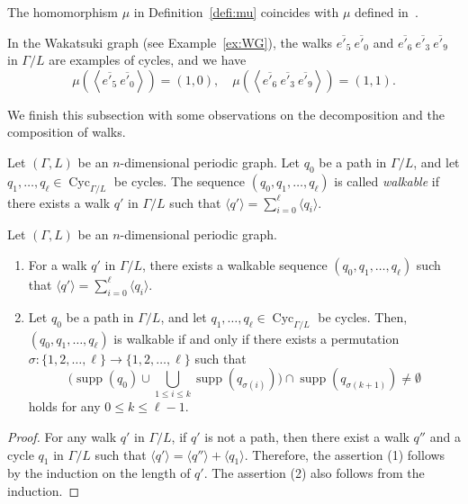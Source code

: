 \documentclass[ALCO,published]{cedram}
\theoremstyle{remark}
\begin{document}
\begin{rmk}\label{rmk:mu}
The homomorphism $\mu$ in Definition~\ref{defi:mu} coincides with $\mu$ defined in~\cite[Section 6.1]{Sunada}. 
\end{rmk}


\begin{ex}
In the Wakatsuki graph (see Example~\ref{ex:WG}), 
the walks $\overline{e'_5} \ \overline{e'_0}$ and $\overline{e'_6} \ \overline{e'_3} \ \overline{e'_9}$ in $\Gamma / L$ are examples of cycles, and we have 
\[
\mu \left( \left \langle \overline{e'_5} \ \overline{e'_0} \right \rangle \right) = (1,0), \quad 
\mu \left( \left \langle \overline{e'_6} \ \overline{e'_3} \ \overline{e'_9} \right \rangle \right) = (1,1). 
\]
\end{ex}

We finish this subsection with some observations on the decomposition and the composition of walks.


\begin{defi}
Let $(\Gamma, L)$ be an $n$-dimensional periodic graph. 
Let $q_0$ be a path in $\Gamma /L$, and let $q_1, \ldots, q_{\ell} \in \operatorname{Cyc}_{\Gamma /L}$ be cycles. 
The sequence $(q_0, q_1, \ldots, q_{\ell})$ is called \textit{walkable} 
if there exists a walk $q'$ in $\Gamma / L$ such that 
$\langle q' \rangle = \sum _{i = 0} ^{\ell} \langle q_i \rangle$. 
\end{defi}

\begin{lem}\label{lem:bunkai}
Let $(\Gamma, L)$ be an $n$-dimensional periodic graph. 
\begin{enumerate}
\item 
For a walk $q'$ in $\Gamma / L$, there exists a walkable sequence $(q_0, q_1, \ldots , q_{\ell})$ such that 
$\langle q' \rangle = \sum _{i = 0} ^{\ell} \langle q_i \rangle$. 

\item 
Let $q_0$ be a path in $\Gamma /L$, and let $q_1, \ldots, q_{\ell} \in \operatorname{Cyc}_{\Gamma /L}$ be cycles. 
Then, $(q_0, q_1, \ldots, q_{\ell})$ is walkable if and only if 
there exists a permutation $\sigma:  \{ 1,2, \ldots, \ell \} \to \{ 1,2, \ldots, \ell \}$ such that
\[
\biggl( \operatorname{supp}(q_0) \cup \bigcup _{1 \le i \le k} \operatorname{supp}(q_{\sigma(i)}) \biggr) 
\cap \operatorname{supp}(q_{\sigma(k+1)}) \not = \emptyset
\] 
holds for any $0 \le k \le \ell -1$.

\end{enumerate}
\end{lem}
\begin{proof}
For any walk $q'$ in $\Gamma /L$, 
if $q'$ is not a path, then 
there exist a walk $q''$ and a cycle $q_1$ in $\Gamma /L$ 
such that $\langle q' \rangle = \langle q'' \rangle + \langle q_1 \rangle$. 
Therefore, the assertion (1) follows by the induction on the length of $q'$. 
The assertion (2) also follows from the induction. 
\end{proof}
\end{document}
